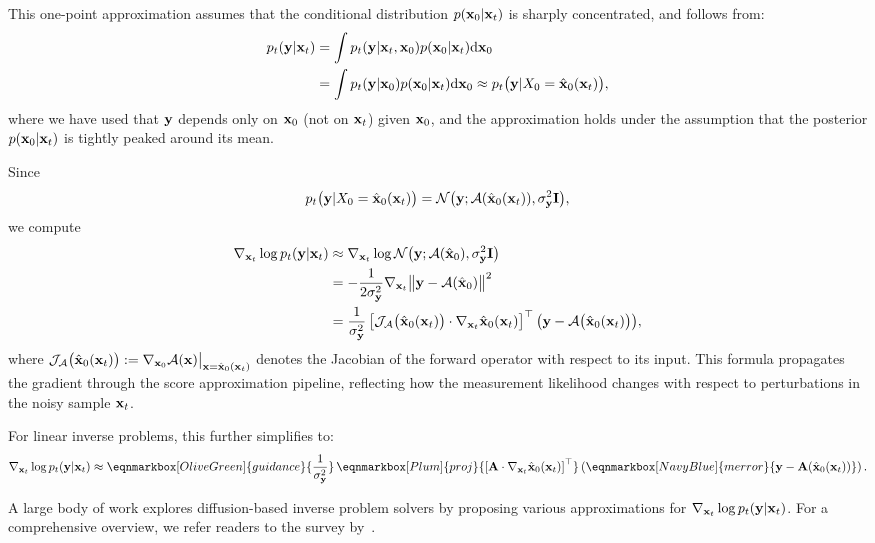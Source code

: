 This one-point approximation assumes that the conditional distribution $p({\mathbf{x}}_0|{\mathbf{x}}_t)$ is sharply concentrated, and follows from:
\begin{align*}
  p_t({\mathbf{y}}|{\mathbf{x}}_t)
  &= \int p_t({\mathbf{y}}|{\mathbf{x}}_t, {\mathbf{x}}_0)  p({\mathbf{x}}_0|{\mathbf{x}}_t)  \mathrm{d}{\mathbf{x}}_0 \\
  &= \int p_t({\mathbf{y}}|{\mathbf{x}}_0)  p({\mathbf{x}}_0|{\mathbf{x}}_t)  \mathrm{d}{\mathbf{x}}_0 
   \approx  p_t\bigl({\mathbf{y}}|X_0=\hat{{\mathbf{x}}}_0({\mathbf{x}}_t)\bigr),
\end{align*}
where we have used that ${\mathbf{y}}$ depends only on ${\mathbf{x}}_0$ (not on ${\mathbf{x}}_t$) given ${\mathbf{x}}_0$, and the approximation holds under the assumption that the posterior $p({\mathbf{x}}_0|{\mathbf{x}}_t)$ is tightly peaked around its mean.

Since 
\[
  p_t\bigl({\mathbf{y}}|X_0 = \hat{{\mathbf{x}}}_0({\mathbf{x}}_t)\bigr)
  = \mathcal{N}\bigl({\mathbf{y}};  \mathcal{A}(\hat{{\mathbf{x}}}_0({\mathbf{x}}_t)),  \sigma_{{\mathbf{y}}}^2 {\mathbf{I}}\bigr),
\]
we compute
\begin{align*}
  \nabla_{{\mathbf{x}}_t} \log p_t({\mathbf{y}}|{\mathbf{x}}_t)
  &\approx \nabla_{{\mathbf{x}}_t} \log \mathcal{N}\bigl({\mathbf{y}};  \mathcal{A}(\hat{{\mathbf{x}}}_0),  \sigma_{{\mathbf{y}}}^2 {\mathbf{I}}\bigr) \\
  &= -\frac{1}{2\sigma_{{\mathbf{y}}}^2}  \nabla_{{\mathbf{x}}_t} \bigl\| {\mathbf{y}} - \mathcal{A}(\hat{{\mathbf{x}}}_0) \bigr\|^2 \quad  \\
  &= \frac{1}{\sigma_{{\mathbf{y}}}^2}  \left[ \mathcal{J}_{\mathcal{A}}\big(\hat{{\mathbf{x}}}_0({\mathbf{x}}_t)\big) \cdot \nabla_{{\mathbf{x}}_t} \hat{{\mathbf{x}}}_0({\mathbf{x}}_t) \right]^\top \bigl( {\mathbf{y}} - \mathcal{A}\big(\hat{{\mathbf{x}}}_0({\mathbf{x}}_t)\big) \bigr),
\end{align*}
where $\mathcal{J}_{\mathcal{A}}\big(\hat{{\mathbf{x}}}_0({\mathbf{x}}_t)\big) := \nabla_{{\mathbf{x}}_0} \mathcal{A}({\mathbf{x}}) \big|_{{\mathbf{x}} = \hat{{\mathbf{x}}}_0({\mathbf{x}}_t)}$ denotes the Jacobian of the forward operator with respect to its input. This formula propagates the gradient through the score approximation pipeline, reflecting how the measurement likelihood changes with respect to perturbations in the noisy sample ${\mathbf{x}}_t$.

For linear inverse problems, this further simplifies to:
\begin{align*}
    \nabla_{\rvx_t} \log p_t(\rvy | \rvx_t) \approx \eqnmarkbox[OliveGreen]{guidance}{\frac{1}{\sigma_{\rvy}^2}}  \,  \eqnmarkbox[Plum]{proj}{\left[ \rmA \cdot \nabla_{\rvx_t} \hat\rvx_0(\rvx_t) \right]^\top} \left(\eqnmarkbox[NavyBlue]{merror}{\rvy - \rmA(\hat\rvx_0(\rvx_t))}\right).
\end{align*}

A large body of work explores diffusion-based inverse problem solvers by proposing various approximations for $\nabla_{{\mathbf{x}}_t} \log p_t({\mathbf{y}} | {\mathbf{x}}_t)$.  For a comprehensive overview, we refer readers to the survey by~\citet{daras2024survey}.



